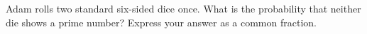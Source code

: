 Adam rolls two standard six-sided dice once. What is the probability that neither die shows a prime number? Express your answer as a common fraction.
